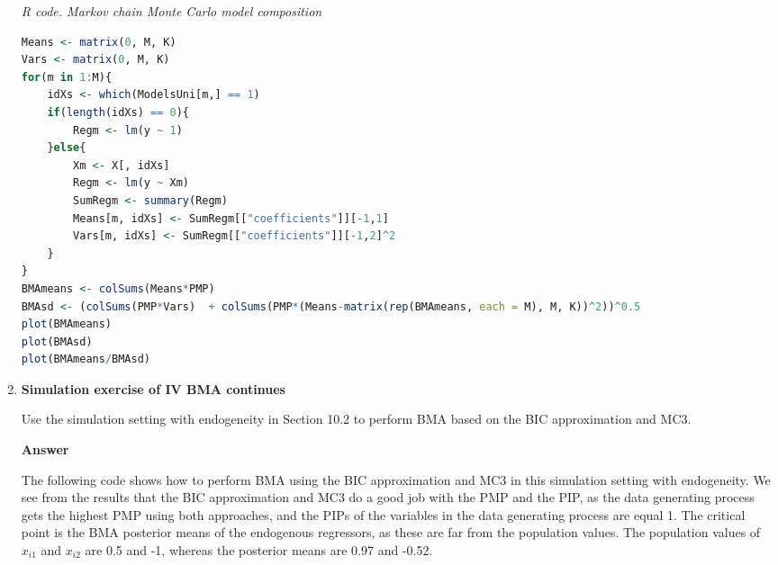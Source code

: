 \begin{enumerate}[leftmargin=*]
\begin{tcolorbox}[enhanced,width=4.67in,center upper,
	fontupper=\large\bfseries,drop shadow southwest,sharp corners]
	\textit{R code. Markov chain Monte Carlo model composition}
	\begin{VF}
		\begin{lstlisting}[language=R]
Means <- matrix(0, M, K)
Vars <- matrix(0, M, K)
for(m in 1:M){
	idXs <- which(ModelsUni[m,] == 1)
	if(length(idXs) == 0){
		Regm <- lm(y ~ 1)
	}else{
		Xm <- X[, idXs]
		Regm <- lm(y ~ Xm)
		SumRegm <- summary(Regm)
		Means[m, idXs] <- SumRegm[["coefficients"]][-1,1]
		Vars[m, idXs] <- SumRegm[["coefficients"]][-1,2]^2 
	}
}
BMAmeans <- colSums(Means*PMP)
BMAsd <- (colSums(PMP*Vars)  + colSums(PMP*(Means-matrix(rep(BMAmeans, each = M), M, K))^2))^0.5 
plot(BMAmeans)
plot(BMAsd)
plot(BMAmeans/BMAsd)
\end{lstlisting}
\end{VF}
\end{tcolorbox}

\item \textbf{Simulation exercise of IV BMA continues}

Use the simulation setting with endogeneity in Section 10.2 to perform BMA based on the BIC approximation and MC3.

\textbf{Answer}

The following code shows how to perform BMA using the BIC approximation and MC3 in this simulation setting with endogeneity. We see from the results that the BIC approximation and MC3 do a good job with the PMP and the PIP, as the data generating process gets the highest PMP using both approaches, and the PIPs of the variables in the data generating process are equal 1. The critical point is the BMA posterior means of the endogenous regressors, as these are far from the population values. The population values of $x_{i1}$ and $x_{i2}$ are 0.5 and -1, whereas the posterior means are 0.97 and -0.52. 


\end{enumerate}
